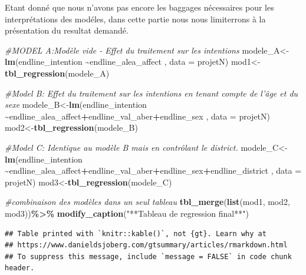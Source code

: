 \documentclass[
]{article}
\newenvironment{Shaded}{\begin{snugshade}}{\end{snugshade}}
\newcommand{\AttributeTok}[1]{\textcolor[rgb]{0.13,0.29,0.53}{#1}}
\newcommand{\CommentTok}[1]{\textcolor[rgb]{0.56,0.35,0.01}{\textit{#1}}}
\newcommand{\FunctionTok}[1]{\textcolor[rgb]{0.13,0.29,0.53}{\textbf{#1}}}
\newcommand{\NormalTok}[1]{#1}
\newcommand{\OtherTok}[1]{\textcolor[rgb]{0.56,0.35,0.01}{#1}}
\newcommand{\SpecialCharTok}[1]{\textcolor[rgb]{0.81,0.36,0.00}{\textbf{#1}}}
\newcommand{\StringTok}[1]{\textcolor[rgb]{0.31,0.60,0.02}{#1}}
\begin{document}
Etant donné que nous n'avons pas encore les baggages nécessaires pour
les interprétations des modéles, dans cette partie nous nous limiterrons
à la présentation du resultat demandé.

\begin{Shaded}
\begin{Highlighting}[]
\CommentTok{\#MODEL A:Modèle vide {-} Effet du traitement sur les intentions}
\NormalTok{modele\_A}\OtherTok{\textless{}{-}}\FunctionTok{lm}\NormalTok{(endline\_intention }\SpecialCharTok{\textasciitilde{}}\NormalTok{endline\_alea\_affect , }\AttributeTok{data =}\NormalTok{ projetN)}
\NormalTok{mod1}\OtherTok{\textless{}{-}}\FunctionTok{tbl\_regression}\NormalTok{(modele\_A)}

\CommentTok{\#Model B: Effet du traitement sur les intentions en tenant compte de l’âge et du sexe}
\NormalTok{modele\_B}\OtherTok{\textless{}{-}}\FunctionTok{lm}\NormalTok{(endline\_intention }\SpecialCharTok{\textasciitilde{}}\NormalTok{endline\_alea\_affect}\SpecialCharTok{+}\NormalTok{endline\_val\_aber}\SpecialCharTok{+}\NormalTok{endline\_sex , }\AttributeTok{data =}\NormalTok{ projetN)}
\NormalTok{mod2}\OtherTok{\textless{}{-}}\FunctionTok{tbl\_regression}\NormalTok{(modele\_B)}

\CommentTok{\#Model C: Identique au modèle B mais en contrôlant le district. }
\NormalTok{modele\_C}\OtherTok{\textless{}{-}}\FunctionTok{lm}\NormalTok{(endline\_intention }\SpecialCharTok{\textasciitilde{}}\NormalTok{endline\_alea\_affect}\SpecialCharTok{+}\NormalTok{endline\_val\_aber}\SpecialCharTok{+}\NormalTok{endline\_sex}\SpecialCharTok{+}\NormalTok{endline\_district , }\AttributeTok{data =}\NormalTok{ projetN)}
\NormalTok{mod3}\OtherTok{\textless{}{-}}\FunctionTok{tbl\_regression}\NormalTok{(modele\_C)}

\CommentTok{\#combinaison des modèles dans un seul tableau}
\FunctionTok{tbl\_merge}\NormalTok{(}\FunctionTok{list}\NormalTok{(mod1, mod2, mod3))}\SpecialCharTok{\%\textgreater{}\%} \FunctionTok{modify\_caption}\NormalTok{(}\StringTok{"**Tableau de regression final**"}\NormalTok{)}
\end{Highlighting}
\end{Shaded}

\begin{verbatim}
## Table printed with `knitr::kable()`, not {gt}. Learn why at
## https://www.danieldsjoberg.com/gtsummary/articles/rmarkdown.html
## To suppress this message, include `message = FALSE` in code chunk header.
\end{verbatim}
\end{document}
